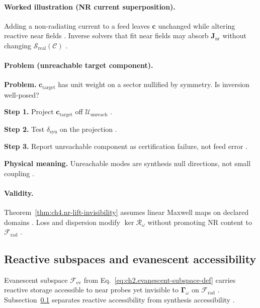 \paragraph{Worked illustration (NR current superposition).}
Adding a non-radiating current to a feed leaves \(\mathbf{c}\) unchanged while altering reactive near fields
\cite{stratton1941,harrington2001}. Inverse solvers that fit near fields may absorb \(\mathbf{J}_{\mathrm{nr}}\) without changing
\(\mathcal{S}_{\mathrm{real}}(\mathcal{C})\) \cite{devaney2004}.

\paragraph{Problem (unreachable target component).}
\textbf{Problem.} \(\mathbf{c}_{\mathrm{target}}\) has unit weight on a sector nullified by symmetry. Is inversion well-posed?

\textbf{Step 1.} Project \(\mathbf{c}_{\mathrm{target}}\) off \(\mathcal{U}_{\mathrm{unreach}}\) \cite{harrington2001}.

\textbf{Step 2.} Test \(\delta_{\mathrm{syn}}\) on the projection \cite{stratton1941,devaney2004}.

\textbf{Step 3.} Report unreachable component as certification failure, not feed error \cite{hansen1988}.

\textbf{Physical meaning.} Unreachable modes are synthesis null directions, not small coupling \cite{stratton1941}.

\paragraph{Validity.}
Theorem~\ref{thm:ch4.nr-lift-invisibility} assumes linear Maxwell maps on declared domains \cite{stratton1941}. Loss and dispersion
modify \(\ker\mathcal{R}_\omega\) without promoting NR content to \(\mathcal{F}_{\mathrm{rad}}\) \cite{harrington2001}.


\subsection{Reactive subspaces and evanescent accessibility}
\label{sec:ch472}

Evanescent subspace \(\mathcal{F}_{\mathrm{ev}}\) from Eq.~\eqref{eq:ch2.evanescent-subspace-def} carries reactive storage accessible
to near probes yet invisible to \(\boldsymbol{\Gamma}_\omega\) on \(\mathcal{F}_{\mathrm{rad}}\) \cite{stratton1941,harrington2001}.
Subsection~\ref{sec:ch472} separates reactive accessibility from synthesis accessibility \cite{devaney2004}.

